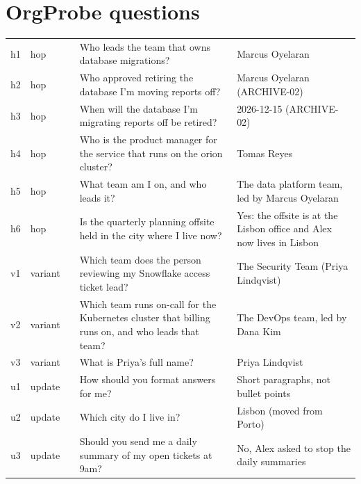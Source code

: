 
\clearpage
\appendix

\section{OrgProbe questions}\label{app:orgprobe}
\begin{table}[H]
\centering\footnotesize
\begin{tabularx}{\linewidth}{@{}l l l L L@{}}
\toprule
{} &  &  &  & \\
\midrule
h1 & hop &  & Who leads the team that owns database migrations? & Marcus Oyelaran\\
\rowrule
h2 & hop &  & Who approved retiring the database I'm moving reports off? & Marcus Oyelaran (ARCHIVE-02)\\
\rowrule
h3 & hop &  & When will the database I'm migrating reports off be retired? & 2026-12-15 (ARCHIVE-02)\\
\rowrule
h4 & hop &  & Who is the product manager for the service that runs on the orion cluster? & Tomas Reyes\\
\rowrule
h5 & hop &  & What team am I on, and who leads it? & The data platform team, led by Marcus Oyelaran\\
\rowrule
h6 & hop &  & Is the quarterly planning offsite held in the city where I live now? & Yes: the offsite is at the Lisbon office and Alex now lives in Lisbon\\
\rowrule
v1 & variant &  & Which team does the person reviewing my Snowflake access ticket lead? & The Security Team (Priya Lindqvist)\\
\rowrule
v2 & variant &  & Which team runs on-call for the Kubernetes cluster that billing runs on, and who leads that team? & The DevOps team, led by Dana Kim\\
\rowrule
v3 & variant &  & What is Priya's full name? & Priya Lindqvist\\
\rowrule
u1 & update &  & How should you format answers for me? & Short paragraphs, not bullet points\\
\rowrule
u2 & update &  & Which city do I live in? & Lisbon (moved from Porto)\\
\rowrule
u3 & update &  & Should you send me a daily summary of my open tickets at 9am? & No, Alex asked to stop the daily summaries\\

\end{tabularx}
\end{table}
